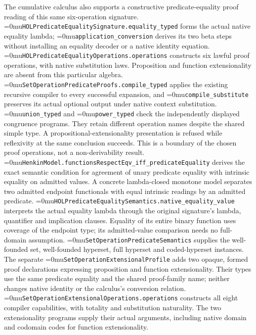 \documentclass[11pt]{article}
\newcommand{\leanname}[1]{\textup{\Urlmuskip=0mu\relax\nolinkurl{#1}}}
\theoremstyle{definition}
\theoremstyle{remark}
\begin{document}
The cumulative calculus also supports a constructive predicate-equality proof
reading of this same six-operation signature.
\leanname{HOLPredicateEqualitySignature.equality_typed} forms the actual
native equality lambda; \leanname{application_conversion} derives its two
beta steps without installing an equality decoder or a native identity equation.
\leanname{HOLPredicateEqualityOperations.operations} constructs six lawful
proof operations, with native substitution laws. Proposition and function
extensionality are absent from this particular algebra.
\leanname{SetOperationPredicateProofs.compile_typed} applies the existing
recursive compiler to every successful expansion, and \leanname{compile_substitute}
preserves its actual optional output under native context substitution.
\leanname{union_typed} and \leanname{power_typed} check the independently
displayed congruence programs. They retain different operation names despite
the shared simple type. A propositional-extensionality presentation is refused
while reflexivity at the same conclusion succeeds. This is a boundary of the
chosen proof operations, not a non-derivability result. \leanname{HenkinModel.functionsRespectEqv_iff_predicateEquality} derives the
exact semantic condition for agreement of unary predicate equality with intrinsic
equality on admitted values. A concrete lambda-closed monotone model separates
two admitted endpoint functionals with equal intrinsic readings by an admitted
predicate. \leanname{HOLPredicateEqualitySemantics.native_equality_value}
interprets the actual equality lambda through the original signature's lambda,
quantifier and implication clauses. Equality of its entire binary function uses
coverage of the endpoint type; its admitted-value comparison needs no full-domain
assumption. \leanname{SetOperationPredicateSemantics} supplies the well-founded
set, well-founded hyperset, full hyperset and coded-hyperset instances.
The separate \leanname{SetOperationExtensionalProfile} adds two opaque,
formed proof declarations expressing proposition and function extensionality.
Their types use the same predicate equality and the shared proof-family name;
neither changes native identity or the calculus's conversion relation.
\leanname{SetOperationExtensionalOperations.operations} constructs all eight
compiler capabilities, with totality and substitution naturality. The two
extensionality programs supply their actual arguments, including native domain
and codomain codes for function extensionality.
\end{document}
